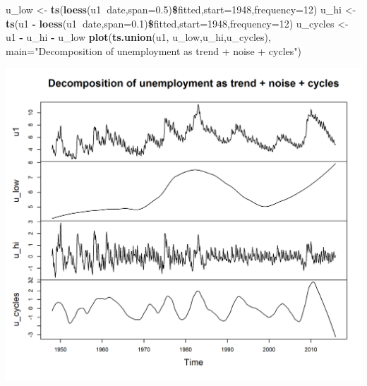 \documentclass[]{article}
\newenvironment{Shaded}{\begin{snugshade}}{\end{snugshade}}
\newcommand{\KeywordTok}[1]{\textcolor[rgb]{0.13,0.29,0.53}{\textbf{#1}}}
\newcommand{\DataTypeTok}[1]{\textcolor[rgb]{0.13,0.29,0.53}{#1}}
\newcommand{\DecValTok}[1]{\textcolor[rgb]{0.00,0.00,0.81}{#1}}
\newcommand{\FloatTok}[1]{\textcolor[rgb]{0.00,0.00,0.81}{#1}}
\newcommand{\StringTok}[1]{\textcolor[rgb]{0.31,0.60,0.02}{#1}}
\newcommand{\OperatorTok}[1]{\textcolor[rgb]{0.81,0.36,0.00}{\textbf{#1}}}
\newcommand{\NormalTok}[1]{#1}
\begin{document}
\begin{Shaded}
\begin{Highlighting}[]
\NormalTok{u_low <-}\StringTok{ }\KeywordTok{ts}\NormalTok{(}\KeywordTok{loess}\NormalTok{(u1}\OperatorTok{~}\NormalTok{date,}\DataTypeTok{span=}\FloatTok{0.5}\NormalTok{)}\OperatorTok{\$}\NormalTok{fitted,}\DataTypeTok{start=}\DecValTok{1948}\NormalTok{,}\DataTypeTok{frequency=}\DecValTok{12}\NormalTok{)}
\NormalTok{u_hi <-}\StringTok{ }\KeywordTok{ts}\NormalTok{(u1 }\OperatorTok{-}\StringTok{ }\KeywordTok{loess}\NormalTok{(u1}\OperatorTok{~}\NormalTok{date,}\DataTypeTok{span=}\FloatTok{0.1}\NormalTok{)}\OperatorTok{\$}\NormalTok{fitted,}\DataTypeTok{start=}\DecValTok{1948}\NormalTok{,}\DataTypeTok{frequency=}\DecValTok{12}\NormalTok{)}
\NormalTok{u_cycles <-}\StringTok{ }\NormalTok{u1 }\OperatorTok{-}\StringTok{ }\NormalTok{u_hi }\OperatorTok{-}\StringTok{ }\NormalTok{u_low}
\KeywordTok{plot}\NormalTok{(}\KeywordTok{ts.union}\NormalTok{(u1, u_low,u_hi,u_cycles),}
  \DataTypeTok{main=}\StringTok{"Decomposition of unemployment as trend + noise + cycles"}\NormalTok{)}
\end{Highlighting}
\end{Shaded}

\begin{center}\includegraphics{figure/intro-cycles-1} \end{center}

\end{document}
